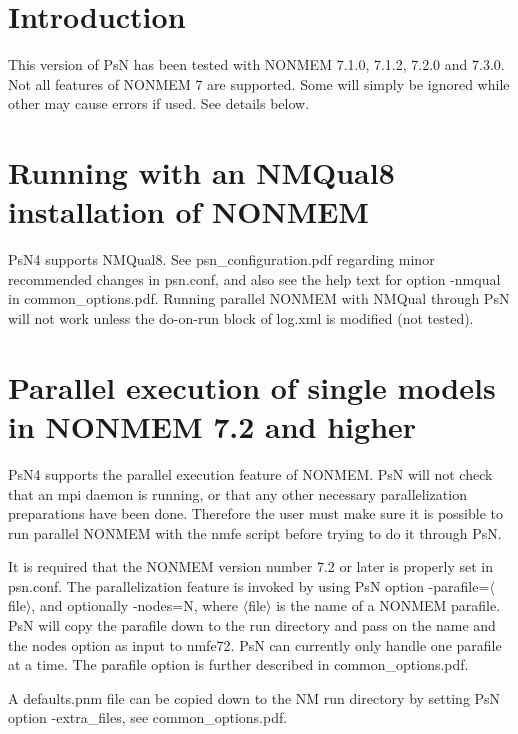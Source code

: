 



\maketitle


\section{Introduction}
This version of PsN has been tested with NONMEM 7.1.0, 7.1.2, 7.2.0 and 7.3.0. Not all features of NONMEM 7 are supported. Some will simply be ignored while other may cause errors if used. See details below.

\section{Running with an NMQual8 installation of NONMEM}
PsN4 supports NMQual8. See psn\_configuration.pdf regarding minor recommended changes in psn.conf, and also see
the help text for option -nmqual in common\_options.pdf.
Running parallel NONMEM with NMQual through PsN will not work unless the do-on-run block of log.xml is modified
(not tested).

\section{Parallel execution of single models in NONMEM 7.2 and higher}
PsN4 supports the parallel execution feature of NONMEM. PsN will not check that an mpi daemon is running, or that any other necessary parallelization preparations have been done. Therefore the user must make sure it is possible to run parallel NONMEM with the nmfe script before trying to do it through PsN.

It is required that the NONMEM version number 7.2 or later is properly set in psn.conf. 
The parallelization feature is invoked by using PsN option -parafile=$\langle$file$\rangle$, and optionally -nodes=N, where $\langle$file$\rangle$ is the name of a NONMEM parafile. PsN will copy the parafile down to the run directory and pass on the name and the nodes option as input to nmfe72. PsN can currently only handle one parafile at a time. The parafile option is further described in common\_options.pdf.

A defaults.pnm file can be copied down to the NM run directory by setting PsN option -extra\_files, see common\_options.pdf.

